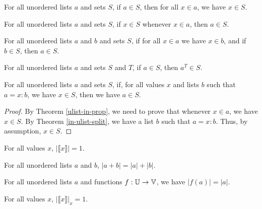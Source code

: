\documentclass[../math.tex]{subfiles}
\begin{document}
\begin{theorem} \label{ulist-prop-in}
    For all unordered lists $a$ and sets $S$, if $a \in S$, then for all $x \in
    a$, we have $x \in S$.
\end{theorem}

\begin{theorem} \label{ulist-in-prop}
    For all unordered lists $a$ and sets $S$, if $x \in S$ whenever $x \in a$,
    then $a \in S$.
\end{theorem}

\begin{theorem} \label{ulist-prop-in-sub}
    For all unordered lists $a$ and $b$ and sets $S$, if for all $x \in a$ we
    have $x \in b$, and if $b \in S$, then $a \in S$.
\end{theorem}

\begin{theorem} \label{ulist-prop-other-filter}
    For all unordered lists $a$ and sets $S$ and $T$, if $a \in S$, then $a^T
    \in S$.
\end{theorem}

\begin{theorem} \label{ulist-prop-split}
    For all unordered lists $a$ and sets $S$, if, for all values $x$ and lists
    $b$ such that $a = x : b$, we have $x \in S$, then we have $a \in S$.
\end{theorem}
\begin{proof}
    By Theorem \ref{ulist-in-prop}, we need to prove that whenever $x \in a$, we
    have $x \in S$.  By Theorem \ref{in-ulist-split}, we have a list $b$ such
    that $a = x : b$.  Thus, by assumption, $x \in S$.
\end{proof}

\begin{theorem}
    For all values $x$, $|\llbracket x\rrbracket| = 1$.
\end{theorem}

\begin{theorem} \label{ulist-size-conc}
    For all unordered lists $a$ and $b$, $|a + b| = |a| + |b|$.
\end{theorem}

\begin{theorem} \label{ulist-image-size}
    For all unordered lists $a$ and functions $f : \mathbb{U} \to \mathbb{V}$, we have $|f(a)| =
    |a|$.
\end{theorem}

\begin{theorem}
    For all values $x$, $|\llbracket x\rrbracket |_x = 1$.
\end{theorem}
\end{document}
